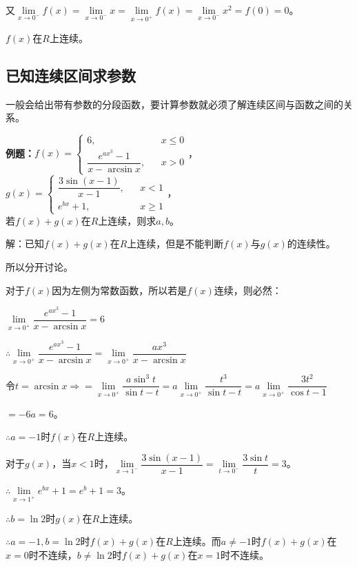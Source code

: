 \documentclass[UTF8, 12pt]{ctexart}
\begin{document}
又$\lim\limits_{x\to 0^-}f(x)=\lim\limits_{x\to 0^-}x=\lim\limits_{x\to 0^+}f(x)=\lim\limits_{x\to 0^-}x^2=f(0)=0$。

$f(x)$在$R$上连续。

\subsection{已知连续区间求参数}

一般会给出带有参数的分段函数，要计算参数就必须了解连续区间与函数之间的关系。

\textbf{例题：}$f(x)=\left\{\begin{array}{lcl}
        6,                               &  & x\leqslant 0 \\
        \dfrac{e^{ax^3}-1}{x-\arcsin x}, &  & x>0
    \end{array}
    \right.$，$g(x)=\left\{\begin{array}{lcl}
        \dfrac{3\sin(x-1)}{x-1}, &  & x<1          \\
        e^{bx}+1,                &  & x\geqslant 1
    \end{array}
    \right.$，\smallskip \\ 若$f(x)+g(x)$在$R$上连续，则求$a,b$。

解：已知$f(x)+g(x)$在$R$上连续，但是不能判断$f(x)$与$g(x)$的连续性。

所以分开讨论。

对于$f(x)$因为左侧为常数函数，所以若是$f(x)$连续，则必然：\medskip

$\lim\limits_{x\to 0^+}\dfrac{e^{ax^3}-1}{x-\arcsin x}=6$\medskip

$\therefore\lim\limits_{x\to 0^+}\dfrac{e^{ax^3}-1}{x-\arcsin x}=\lim\limits_{x\to 0^+}\dfrac{ax^3}{x-\arcsin x}$\medskip

$\text{令}t=\arcsin x\Rightarrow=\lim\limits_{x\to 0^+}\dfrac{a\sin^3t}{\sin t-t}=a\lim\limits_{x\to 0^+}\dfrac{t^3}{\sin t-t}=a\lim\limits_{x\to 0^+}\dfrac{3t^2}{\cos t-1}$

$=-6a=6$。

$\therefore a=-1$时$f(x)$在$R$上连续。\medskip

对于$g(x)$，当$x<1$时，$\lim\limits_{x\to 1^-}\dfrac{3\sin(x-1)}{x-1}=\lim\limits_{t\to 0^-}\dfrac{3\sin t}{t}=3$。\medskip

$\therefore\lim\limits_{x\to 1^+}e^{bx}+1=e^b+1=3$。\medskip

$\therefore b=\ln 2$时$g(x)$在$R$上连续。\medskip

$\therefore a=-1,b=\ln 2$时$f(x)+g(x)$在$R$上连续。而$a\neq -1$时$f(x)+g(x)$在$x=0$时不连续，$b\neq\ln 2$时$f(x)+g(x)$在$x=1$时不连续。
\end{document}
